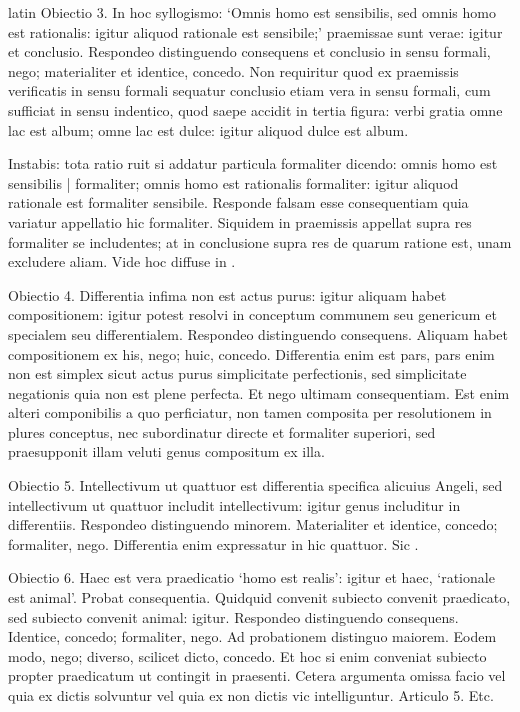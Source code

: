\begin{otherlanguage*}{latin}
\pstart
Obiectio 3. In hoc syllogismo:
`Omnis homo est sensibilis, sed omnis homo est rationalis:
igitur aliquod rationale est sensibile;' praemissae sunt verae:
igitur et conclusio. Respondeo distinguendo consequens et conclusio in sensu formali, nego; materialiter et identice, concedo. Non requiritur quod ex praemissis verificatis in sensu formali sequatur conclusio etiam vera in sensu formali, cum sufficiat in sensu indentico, quod saepe accidit in tertia figura:
verbi gratia omne lac est album; omne lac est dulce:
igitur aliquod dulce est album. 
\pend

\pstart
Instabis:
tota ratio ruit si addatur particula formaliter dicendo:
omnis homo est sensibilis \textnormal{|} formaliter; omnis homo est rationalis formaliter:
igitur aliquod rationale est formaliter sensibile. Responde falsam esse consequentiam quia variatur appellatio hic formaliter. Siquidem in praemissis appellat supra res formaliter se includentes; at in conclusione supra res de quarum ratione est, unam excludere aliam. Vide hoc diffuse in . 
\pend

\pstart
Obiectio 4. Differentia infima non est actus purus:
igitur aliquam habet compositionem:
igitur potest resolvi in conceptum communem seu genericum et specialem seu differentialem. Respondeo distinguendo consequens. Aliquam habet compositionem ex his, nego; huic, concedo. Differentia enim est pars, pars enim non est simplex sicut actus purus simplicitate perfectionis, sed simplicitate negationis quia non est plene perfecta. Et nego ultimam consequentiam. Est enim alteri componibilis a quo perficiatur, non tamen composita per resolutionem in plures conceptus, nec subordinatur directe et formaliter superiori, sed praesupponit illam veluti genus compositum ex illa. 
\pend

\pstart
Obiectio 5. Intellectivum ut quattuor est differentia specifica alicuius Angeli, sed intellectivum ut quattuor includit intellectivum:
igitur genus includitur in differentiis. Respondeo distinguendo minorem. Materialiter et identice, concedo; formaliter, nego. Differentia enim expressatur in hic quattuor. Sic . 
\pend

\pstart
Obiectio 6. Haec est vera praedicatio `homo est realis':
igitur et haec, `rationale est animal'. Probat consequentia. Quidquid convenit subiecto convenit praedicato, sed subiecto convenit animal:
igitur. Respondeo distinguendo consequens. Identice, concedo; formaliter, nego. Ad probationem distinguo maiorem. Eodem modo, nego; diverso, scilicet dicto, concedo. Et hoc si enim conveniat subiecto propter praedicatum ut contingit in praesenti. Cetera argumenta omissa facio vel quia ex dictis solvuntur vel quia ex non dictis vic intelliguntur. Articulo 5. Etc. 
\pend


\end{otherlanguage*}

